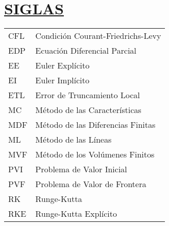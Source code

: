 \section*{\textbf{\underline{SIGLAS}}}

\begin{tabular}{L{1.0 cm}p{11.7 cm}}
    CFL & Condición Courant-Friedrichs-Levy \\
    EDP & Ecuación Diferencial Parcial      \\
    EE  & Euler Explícito                   \\
    EI  & Euler Implícito                   \\
    ETL & Error de Truncamiento Local       \\
    MC  & Método de las Características     \\
    MDF & Método de las Diferencias Finitas \\
    ML  & Método de las Líneas              \\
    MVF & Método de los Volúmenes Finitos   \\
    PVI & Problema de Valor Inicial         \\
    PVF & Problema de Valor de Frontera     \\
    RK  & Runge-Kutta                       \\
    RKE & Runge-Kutta Explícito
\end{tabular}